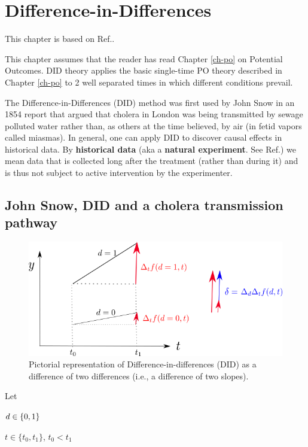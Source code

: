 \chapter{Difference-in-Differences}
\label{ch-did}

This chapter is based on
Ref.\cite{book-mixtape}.

This chapter assumes that the
reader has read Chapter \ref{ch-po}
on Potential Outcomes.
DID theory 
applies the basic single-time
PO theory described in Chapter \ref{ch-po}
to 2
well separated times
in which
different conditions prevail.


The Difference-in-Differences (DID)
method was first used by John Snow
in an 1854 report that
argued that 
cholera in London
was being transmitted 
by sewage polluted water
rather than, as others
at the time believed, by air (in fetid vapors
called miasmas).
In general, one can
apply DID to discover 
causal effects in historical data.
By {\bf historical data} (aka a {\bf natural
experiment}. See Ref.\cite{wiki-nat-exp})
we mean data that is collected long
after the treatment (rather than during it)
 and is thus
not  subject to 
active intervention
by the experimenter. 



\section{John Snow, DID  
and a cholera
transmission pathway}


\begin{figure}[h!]
\centering
\includegraphics[width=5in]
{did/dif-dif.png}
\caption{Pictorial representation of
 Difference-in-differences (DID) as a difference
of two differences (i.e., 
a difference of two slopes).} 
\label{fig-dif-dif}
\end{figure}

Let

$d\in \{0,1\}$

$t\in \{t_0, t_1\}$, $t_0< t_1$

